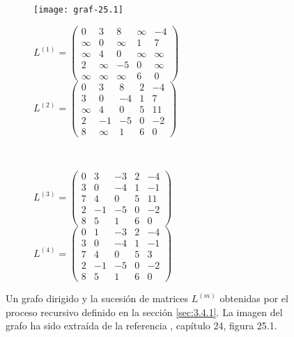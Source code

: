 \begin{figure}[htb]
	\centering
	\begin{subfigure}{\linewidth}
		\texttt{[image: graf-25.1]}
	\end{subfigure}

	\begin{subfigure}{\linewidth}
	$L^{(1)}=\begin{pmatrix}
		0 & 3 & 8 & \infty & -4\\
		\infty & 0 & \infty & 1 & 7 \\
		\infty & 4 & 0 & \infty & \infty \\
		2 & \infty & -5 & 0 & \infty \\
		\infty & \infty & \infty & 6 & 0
	\end{pmatrix}$
	$L^{(2)}=\begin{pmatrix}
		0 & 3 & 8 & 2 & -4\\
		3 & 0 & -4 & 1 & 7 \\
		\infty & 4 & 0 & 5 & 11 \\
		2 & -1 & -5 & 0 & -2 \\
		8 & \infty & 1 & 6 & 0
	\end{pmatrix}$
	\end{subfigure} \\
	\vspace{0.5cm}
	\begin{subfigure}{\linewidth}
	$L^{(3)}=\begin{pmatrix}
		0 & 3 & -3 & 2 & -4\\
		3 & 0 & -4 & 1 & -1 \\
		7 & 4 & 0 & 5 & 11 \\
		2 & -1 & -5 & 0 & -2 \\
		8 & 5 & 1 & 6 & 0
	\end{pmatrix}$
	$L^{(4)}=\begin{pmatrix}
		0 & 1 & -3 & 2 & -4\\
		3 & 0 & -4 & 1 & -1 \\
		7 & 4 & 0 & 5 & 3 \\
		2 & -1 & -5 & 0 & -2 \\
		8 & 5 & 1 & 6 & 0
	\end{pmatrix}$
	\end{subfigure}
	\caption{Un grafo dirigido y la sucesión de matrices $L^{(m)}$ obtenidas por el proceso recursivo definido en la sección \ref{sec:3.4.1}. La imagen del grafo ha sido extraída de la referencia \cite{algorithms}, capítulo 24, figura 25.1.}
	\label{fig:3.4.1}
\end{figure}

